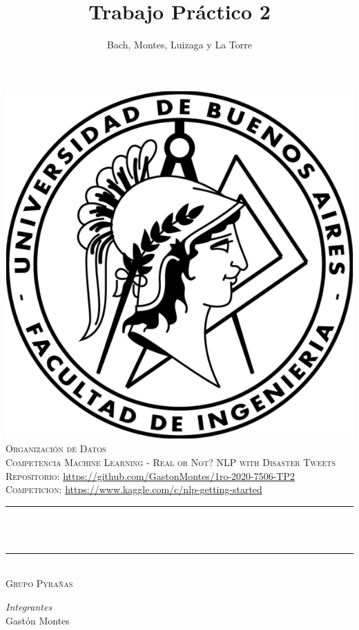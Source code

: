\documentclass[12pt]{article}
\title{Trabajo Práctico 2}						%
\author{Bach, Montes, Luizaga y La Torre}			%
\date{}											%
\makeatletter
\let\thetitle\@title
\makeatother
\begin{document}

\begin{titlepage}
	\centering
    \vspace*{-5 cm}
    \includegraphics[scale = 1]{imgs/fiuba.png}\\[1.0 cm]	%
    \textsc{\LARGE Organización de Datos}\\[0.5 cm]	%
	\textsc{\Large Competencia Machine Learning - Real or Not? NLP with Disaster Tweets}\\[2 cm]
	\textsc{Repositorio: }
	\url{https://github.com/GastonMontes/1ro-2020-7506-TP2}\\[0.5 cm]
	\textsc{Competicion: }
	\url{https://www.kaggle.com/c/nlp-getting-started}\\[0.5 cm]
	\rule{\linewidth}{0.2 mm} \\[0.4 cm]
	{ \huge \bfseries \thetitle}\\
	\rule{\linewidth}{0.2 mm} \\[1.5 cm]
	\textsc{Grupo Pyrañas}\\[1 cm]
	\begin{minipage}{0.4\textwidth}
		\begin{flushleft} \large
			\emph{Integrantes}\\
			Gastón Montes\\

\end{flushleft}
\end{minipage}
\end{titlepage}
\end{document}
